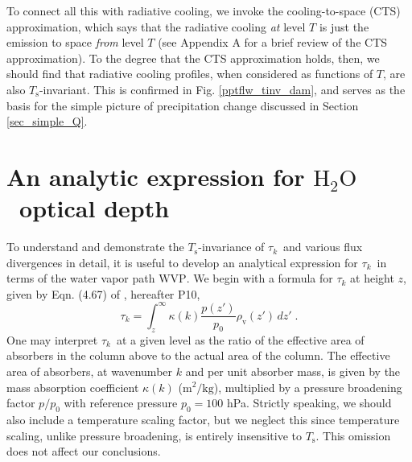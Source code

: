 \documentclass[10pt]{article}
\newcommand{\beqn}{\begin{equation}}
\newcommand{\eeqn}{\end{equation}}
\newcommand{\htwo}{\ensuremath{\mathrm{H_2O}}}
\newcommand{\pierre}{P10}
\newcommand{\tauk}{\ensuremath{\tau_k}}
\newcommand{\rhov}{\ensuremath{\rho_\mathrm{v}}}
\newcommand{\Ts}{\ensuremath{T_\mathrm{s}}}
\newcommand{\WVP}{\ensuremath{\mathrm{WVP}}}
\begin{document}
 To connect all this with radiative cooling, we invoke the cooling-to-space (CTS) approximation, which says that the radiative cooling \emph{at} level $T$ is just the emission to space \emph{from} level $T$ (see Appendix A for a brief review of the CTS approximation). To the degree that the CTS approximation holds, then, we should find that radiative cooling profiles, when considered as functions of $T$, are also \Ts-invariant. This is confirmed in Fig. \ref{pptflw_tinv_dam}, and serves as the basis for the simple picture of precipitation change discussed in Section \ref{sec_simple_Q}.
	
\section{An analytic expression for \htwo\ optical depth}
	To understand and demonstrate the \Ts-invariance of \tauk\ and various flux divergences in detail,  it is useful to develop an analytical expression for \tauk\ in terms of the water vapor path \WVP. We begin with a  formula for $\tau_k$ at height $z$,  given by  Eqn. (4.67) of \cite{pierrehumbert2010}, hereafter \pierre,
	\beqn
		\tau_k = \int_z^\infty \kappa(k) \frac{p(z')}{p_0} \rhov(z') \, dz'  \; .
		\label{tau1}
	\eeqn
One may interpret \tauk\ at a given level as the ratio of the effective area of absorbers in the column above to the actual area of the column. The effective area of absorbers, at wavenumber $k$ and per unit absorber mass, is given by  the mass absorption coefficient $\kappa(k)$ ($\mathrm{m^2/kg}$), multiplied by a pressure broadening factor $p/p_0$ with reference pressure $p_0=100$ hPa. Strictly speaking, we should also include a temperature scaling factor, but we neglect this  since temperature scaling, unlike pressure broadening,  is entirely insensitive to \Ts. This omission does not affect our conclusions.  
\end{document}
